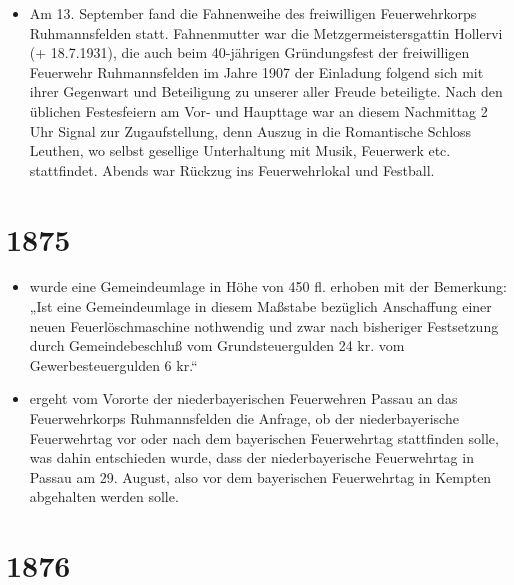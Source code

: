 \documentclass[12pt,a4paper]{book}
\begin{document}
\begin{itemize}
\item Am 13. September fand die Fahnenweihe des freiwilligen
Feuerwehrkorps Ruhmannsfelden statt. Fahnenmutter war die
Metzgermeistersgattin Hollervi (+ 18.7.1931), die auch beim 40-jährigen
Gründungsfest der freiwilligen Feuerwehr Ruhmannsfelden im Jahre 1907
der Einladung folgend sich mit ihrer Gegenwart und Beteiligung zu
unserer aller Freude beteiligte. Nach den üblichen Festesfeiern am Vor-
und Haupttage war an diesem Nachmittag 2 Uhr Signal zur Zugaufstellung,
denn Auszug in die Romantische Schloss Leuthen, wo selbst gesellige
Unterhaltung mit Musik, Feuerwerk etc. stattfindet. Abends war Rückzug
ins Feuerwehrlokal und Festball.
\end{itemize}

\section*{1875}

\begin{itemize}
\item wurde eine Gemeindeumlage in Höhe von 450 fl. erhoben mit der
Bemerkung: „Ist eine Gemeindeumlage in diesem Maßstabe bezüglich
Anschaffung einer neuen Feuerlöschmaschine nothwendig und zwar nach
bisheriger Festsetzung durch Gemeindebeschluß vom Grundsteuergulden 24
kr. vom Gewerbesteuergulden 6 kr.“

\item ergeht vom Vororte der niederbayerischen Feuerwehren Passau an das
Feuerwehrkorps Ruhmannsfelden die Anfrage, ob der niederbayerische
Feuerwehrtag vor oder nach dem bayerischen Feuerwehrtag stattfinden
solle, was dahin entschieden wurde, dass der niederbayerische
Feuerwehrtag in Passau am 29. August, also vor dem bayerischen
Feuerwehrtag in Kempten abgehalten werden solle.
\end{itemize}

\section*{1876}
\end{document}
